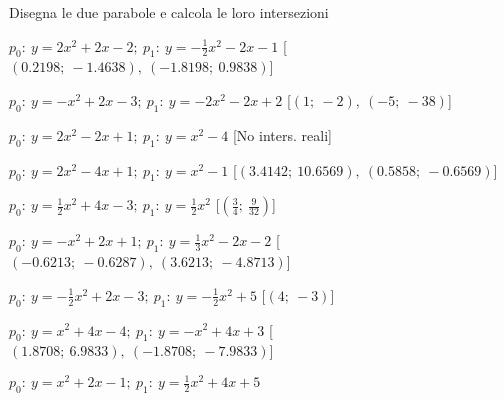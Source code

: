 \begin{esercizio}\label{ese:}
 Disegna le due parabole e calcola le loro intersezioni
 \begin{enumeratea}
  \item  $p_0:~y=2 x^2 +2 x -2;~p_1:~y=-\frac{1}{2} x^2 -2 x -1$
   \hfill [$\left (0.2198;~-1.4638 \right ),~\left (-1.8198;~0.9838 \right )$]
  \item  $p_0:~y=- x^2 +2 x -3;~p_1:~y=-2 x^2 -2 x +2$
   \hfill [$\left (1;~-2 \right ),~\left (-5;~-38 \right )$]
  \item  $p_0:~y=2 x^2 -2 x +1;~p_1:~y=x^2 -4$
   \hfill [No inters. reali]
  \item  $p_0:~y=2 x^2 -4 x +1;~p_1:~y=x^2 -1$
   \hfill [$\left (3.4142;~10.6569 \right ),~\left (0.5858;~-0.6569 \right )$]
  \item  $p_0:~y=\frac{1}{2} x^2 +4 x -3;~p_1:~y=\frac{1}{2} x^2 $
   \hfill [$\left (\frac{3}{4};~\frac{9}{32} \right )$]
  \item  $p_0:~y=- x^2 +2 x +1;~p_1:~y=\frac{1}{3} x^2 -2 x -2$
   \hfill [$\left (-0.6213;~-0.6287 \right ),~\left (3.6213;~-4.8713 \right )$]
  \item  $p_0:~y=-\frac{1}{2} x^2 +2 x -3;~p_1:~y=-\frac{1}{2} x^2 +5$
   \hfill [$\left (4;~-3 \right )$]
  \item  $p_0:~y=x^2 +4 x -4;~p_1:~y=- x^2 +4 x +3$
   \hfill [$\left (1.8708;~6.9833 \right ),~\left (-1.8708;~-7.9833 \right )$]
  \item  $p_0:~y=x^2 +2 x -1;~p_1:~y=\frac{1}{2} x^2 +4 x +5$

\end{enumeratea}
\end{esercizio}
